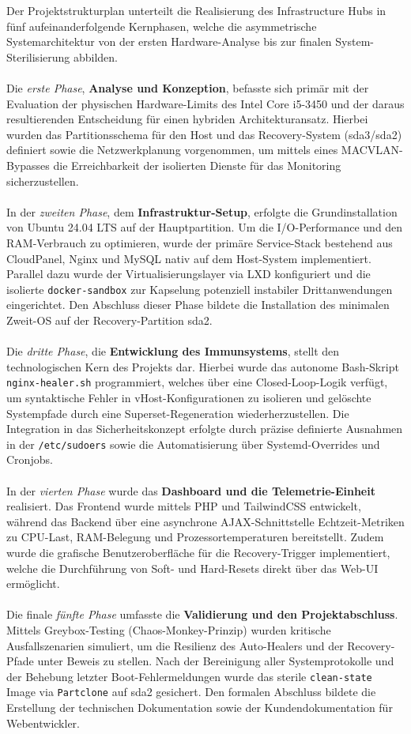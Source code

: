 \documentclass[11pt,
a4paper,
numbers=nonperiod,
footsepline,
oneside,
numbers=noenddot,
bibliography=totoc
]{scrartcl}
\begin{document}
Der Projektstrukturplan unterteilt die Realisierung des Infrastructure Hubs in fünf aufeinanderfolgende Kernphasen, welche die asymmetrische Systemarchitektur von der ersten Hardware-Analyse bis zur finalen System-Sterilisierung abbilden.\\\\
Die \emph{erste Phase}, \textbf{Analyse und Konzeption}, befasste sich primär mit der Evaluation der physischen Hardware-Limits des Intel Core i5-3450 und der daraus resultierenden Entscheidung für einen hybriden Architekturansatz. Hierbei wurden das Partitionsschema für den Host und das Recovery-System (sda3/sda2) definiert sowie die Netzwerkplanung vorgenommen, um mittels eines MACVLAN-Bypasses die Erreichbarkeit der isolierten Dienste für das Monitoring sicherzustellen.\\\\
In der \emph{zweiten Phase}, dem \textbf{Infrastruktur-Setup}, erfolgte die Grundinstallation von Ubuntu 24.04 LTS auf der Hauptpartition. Um die I/O-Performance und den RAM-Verbrauch zu optimieren, wurde der primäre Service-Stack bestehend aus CloudPanel, Nginx und MySQL nativ auf dem Host-System implementiert. Parallel dazu wurde der Virtualisierungslayer via LXD konfiguriert und die isolierte \texttt{docker-sandbox} zur Kapselung potenziell instabiler Drittanwendungen eingerichtet. Den Abschluss dieser Phase bildete die Installation des minimalen Zweit-OS auf der Recovery-Partition sda2.\\\\
Die \emph{dritte Phase}, die \textbf{Entwicklung des Immunsystems}, stellt den technologischen Kern des Projekts dar. Hierbei wurde das autonome Bash-Skript \texttt{nginx-healer.sh} programmiert, welches über eine Closed-Loop-Logik verfügt, um syntaktische Fehler in vHost-Konfigurationen zu isolieren und gelöschte Systempfade durch eine Superset-Regeneration wiederherzustellen. Die Integration in das Sicherheitskonzept erfolgte durch präzise definierte Ausnahmen in der \texttt{/etc/sudoers} sowie die Automatisierung über Systemd-Overrides und Cronjobs.\\\\
In der \emph{vierten Phase} wurde das \textbf{Dashboard und die Telemetrie-Einheit} realisiert. Das Frontend wurde mittels PHP und TailwindCSS entwickelt, während das Backend über eine asynchrone AJAX-Schnittstelle Echtzeit-Metriken zu CPU-Last, RAM-Belegung und Prozessortemperaturen bereitstellt. Zudem wurde die grafische Benutzeroberfläche für die Recovery-Trigger implementiert, welche die Durchführung von Soft- und Hard-Resets direkt über das Web-UI ermöglicht.\\\\
Die finale \emph{fünfte Phase} umfasste die \textbf{Validierung und den Projektabschluss}. Mittels Greybox-Testing (Chaos-Monkey-Prinzip) wurden kritische Ausfallszenarien simuliert, um die Resilienz des Auto-Healers und der Recovery-Pfade unter Beweis zu stellen. Nach der Bereinigung aller Systemprotokolle und der Behebung letzter Boot-Fehlermeldungen wurde das sterile \texttt{clean-state} Image via \texttt{Partclone} auf sda2 gesichert. Den formalen Abschluss bildete die Erstellung der technischen Dokumentation sowie der Kundendokumentation für Webentwickler.
\newpage
\end{document}
